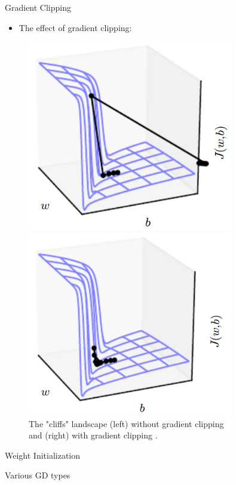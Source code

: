 \begin{frame}{Gradient Clipping}
	\begin{itemize}
		\item The effect of gradient clipping:
	\end{itemize}
	\begin{center}
		\begin{figure}[H]
			\centering
			\begin{minipage}{0.45\textwidth}
				\centering
				\includegraphics[width=0.8\textwidth]{Images/gard-clipping-1.png}
			\end{minipage}%
			\begin{minipage}{0.45\textwidth}
				\centering
				\includegraphics[width=0.8\textwidth]{Images/grad-clipping-2.png}
			\end{minipage}
			\caption{The "cliffs" landscape (left) without gradient clipping\\ and (right) with gradient clipping \cite{Goodfellow-et-al-2016}.}
		\end{figure}
	\end{center}
	
\end{frame}

\begin{frame}{Weight Initialization}
    
\end{frame}

\begin{frame}{Various GD types}
    
\end{frame}